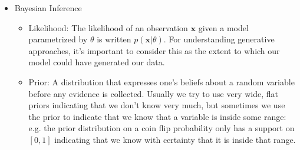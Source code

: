 \documentclass[12pt,letterpaper]{article}
\newcommand{\1}{\mathbbm{1}}
\begin{document}
\begin{itemize}
\begin{itemize}
    \end{itemize}
    \item Bayesian Inference
    \begin{itemize}
    \item Likelihood: The likelihood of an observation $\mathbf{x}$ given a model parametrized by $\theta$ is written $p(\mathbf{x} | \theta)$. For understanding generative approaches, it's important to consider this as the extent to which our model could have generated our data.
    \item Prior: A distribution that expresses one's beliefs about a random variable before any evidence is collected. Usually we try to use very wide, flat priors indicating that we don't know very much, but sometimes we use the prior to indicate that we know that a variable is inside some range: e.g. the prior distribution on a coin flip probability only has a support on $[0, 1]$ indicating that we know with certainty that it is inside that range.

\end{itemize}
\end{itemize}
\end{document}
